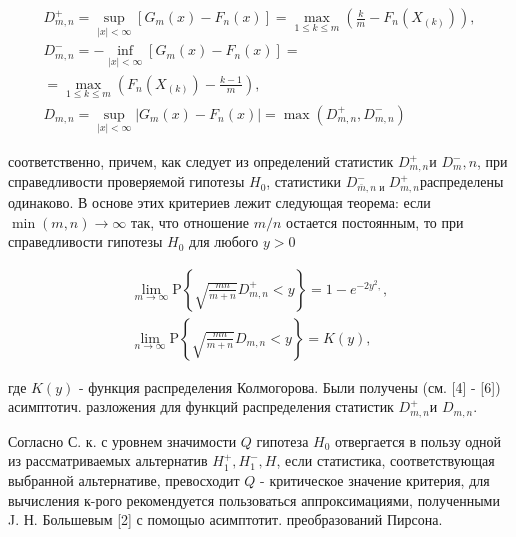 \documentclass[10pt]{article}
\begin{document}
\[

\begin{gathered}

D_{m, n}^{+}=\sup _{|x|<\infty}\left[G_{m}(x)-F_{n}(x)\right]=\max _{1 \leqslant k \leqslant m}\left(\frac{k}{m}-F_{n}\left(X_{(k)}\right)\right), \\

D_{m, n}^{-}=-\inf _{|x|<\infty}\left[G_{m}(x)-F_{n}(x)\right]= \\

=\max _{1 \leqslant k \leqslant m}\left(F_{n}\left(X_{(k)}\right)-\frac{k-1}{m}\right), \\

D_{m, n}=\sup _{|x|<\infty}\left|G_{m}(x)-F_{n}(x)\right|=\max \left(D_{m, n}^{+}, D_{m, n}^{-}\right)

\end{gathered}

\]



соответственно, причем, как следует из определений статистик $D_{m, n}^{+}$и $D_{m}^{-}, n$, при справедливости проверяемой гипотезы $H_{0}$, статистики $D_{\bar{m}, n \text { и }}^{-} D_{m, n}^{+}$распределены одинаково. В основе этих критериев лежит следующая теорема: если $\min (m, n) \rightarrow \infty$ так, что отношение $m / n$ остается постоянным, то при справедливости гипотезы $H_{0}$ для любого $y>0$



\[

\begin{gathered}

\lim _{m \rightarrow \infty} \mathrm{P}\left\{\sqrt{\frac{m n}{m+n}} D_{m, n}^{+}<y\right\}=1-e^{-2 y^{2},}, \\

\lim _{n \rightarrow \infty} \mathrm{P}\left\{\sqrt{\frac{m n}{m+n}} D_{m, n}<y\right\}=K(y),

\end{gathered}

\]



где $K(y)$ - функция распределения Колмогорова. Были получены (см. [4] - [6]) асимптотич. разложения для функций распределения статистик $D_{m, n}^{+}$и $D_{m, n}$.



Согласно С. к. с уровнем значимости $Q$ гипотеза $H_{0}$ отвергается в пользу одной из рассматриваемых альтернатив $H_{1}^{+}, H_{1}^{-}, H$, если статистика, соответствующая выбранной альтернативе, превосходит $Q$ - критическое значение критерия, для вычисления к-рого рекомендуется пользоваться аппроксимациями, полученными J. Н. Большевым [2] с помощыо асимптотит. преобразований Пирсона.
\end{document}

